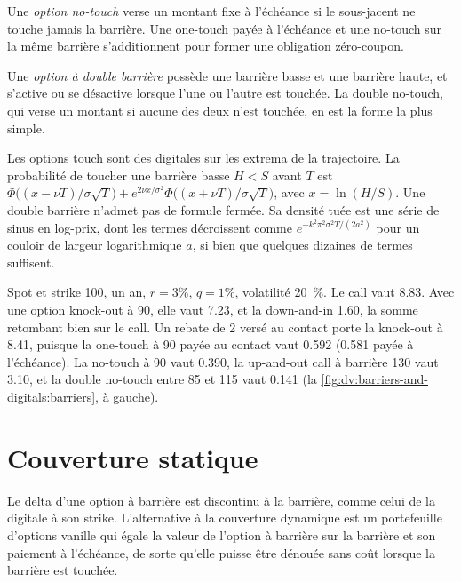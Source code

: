 \begin{definition}\label{def:dv:barriers-and-digitals:notouch}
Une \emph{option no-touch} verse un montant fixe à l'échéance si le sous-jacent ne touche jamais la
barrière. Une one-touch payée à l'échéance et une no-touch sur la même barrière s'additionnent pour former une obligation zéro-coupon.
\end{definition}

\begin{definition}\label{def:dv:barriers-and-digitals:double}
Une \emph{option à double barrière} possède une barrière basse et une barrière haute, et s'active ou se désactive
lorsque l'une ou l'autre est touchée. La double no-touch, qui verse un montant si aucune des deux n'est touchée, en est la forme la plus simple.
\end{definition}

Les options touch sont des digitales sur les extrema de la trajectoire. La probabilité de toucher une barrière basse $H<S$ avant $T$ est
$\Phi\bigl((x-\nu T)/\sigma\sqrt T\bigr)+e^{2\nu x/\sigma^2}\Phi\bigl((x+\nu T)/\sigma\sqrt T\bigr)$, avec
$x=\ln(H/S)$. Une double barrière n'admet pas de formule fermée. Sa densité tuée est une série de sinus en log-prix, dont
les termes décroissent comme $e^{-k^2\pi^2\sigma^2T/(2a^2)}$ pour un couloir de largeur logarithmique $a$, si bien que quelques dizaines de termes suffisent.

\begin{example}\label{ex:dv:barriers-and-digitals:sheet}
Spot et strike 100, un an, $r=3\%$, $q=1\%$, volatilité 20~\%. Le call vaut 8.83. Avec une option knock-out à 90, elle
vaut 7.23, et la down-and-in 1.60, la somme retombant bien sur le call. Un rebate de 2 versé au contact porte la knock-out à 8.41, puisque
la one-touch à 90 payée au contact vaut 0.592 (0.581 payée à l'échéance). La no-touch à 90 vaut 0.390, la up-and-out
call à barrière 130 vaut 3.10, et la double no-touch entre 85 et 115 vaut 0.141
(la \cref{fig:dv:barriers-and-digitals:barriers}, à gauche).
\end{example}

\section{Couverture statique}

Le delta d'une option à barrière est discontinu à la barrière, comme celui de la digitale à son strike. L'alternative à la
couverture dynamique est un portefeuille d'options vanille qui égale la valeur de l'option à barrière sur la barrière et son paiement à l'échéance, de sorte
qu'elle puisse être dénouée sans coût lorsque la barrière est touchée.

